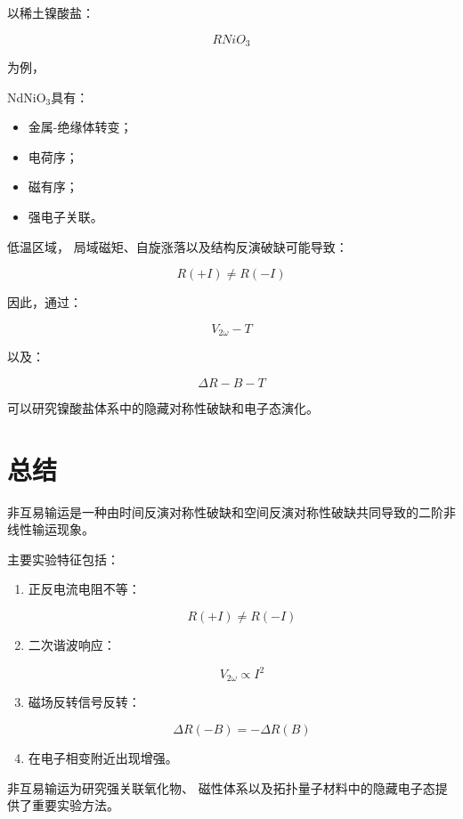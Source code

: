 \documentclass[10.5pt]{article}
\begin{document}
以稀土镍酸盐：

\begin{equation}
RNiO_3
\end{equation}

为例，

NdNiO$_3$具有：

\begin{itemize}
\item 金属-绝缘体转变；
\item 电荷序；
\item 磁有序；
\item 强电子关联。
\end{itemize}


低温区域，
局域磁矩、自旋涨落以及结构反演破缺可能导致：

\begin{equation}
R(+I)\neq R(-I)
\end{equation}


因此，通过：

\begin{equation}
V_{2\omega}-T
\end{equation}

以及：

\begin{equation}
\Delta R-B-T
\end{equation}


可以研究镍酸盐体系中的隐藏对称性破缺和电子态演化。



\section{总结}


非互易输运是一种由时间反演对称性破缺和空间反演对称性破缺共同导致的二阶非线性输运现象。


主要实验特征包括：

\begin{enumerate}

\item 正反电流电阻不等：

\[
R(+I)\neq R(-I)
\]


\item 二次谐波响应：

\[
V_{2\omega}\propto I^2
\]


\item 磁场反转信号反转：

\[
\Delta R(-B)
=
-\Delta R(B)
\]


\item 在电子相变附近出现增强。

\end{enumerate}


非互易输运为研究强关联氧化物、
磁性体系以及拓扑量子材料中的隐藏电子态提供了重要实验方法。
\end{document}
